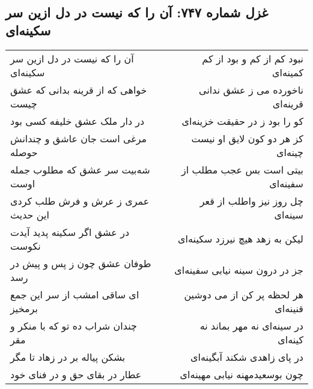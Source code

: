 \begin{center}
\section*{غزل شماره ۷۴۷: آن را که نیست در دل ازین سر سکینه‌ای}
\label{sec:747}
\begin{longtable}{l p{0.5cm} r}
آن را که نیست در دل ازین سر سکینه‌ای
&&
نبود کم از کم و بود از کم کمینه‌ای
\\
خواهی که از قرینه بدانی که عشق چیست
&&
ناخورده می ز عشق ندانی قرینه‌ای
\\
در دار ملک عشق خلیفه کسی بود
&&
کو را بود ز در حقیقت خزینه‌ای
\\
مرغی است جان عاشق و چندانش حوصله
&&
کز هر دو کون لایق او نیست چینه‌ای
\\
شه‌بیت سر عشق که مطلوب جمله اوست
&&
بیتی است بس عجب مطلب از سفینه‌ای
\\
عمری ز عرش و فرش طلب کردی این حدیث
&&
چل روز نیز واطلب از قعر سینه‌ای
\\
در عشق اگر سکینه پدید آیدت نکوست
&&
لیکن به زهد هیچ نیرزد سکینه‌ای
\\
طوفان عشق چون ز پس و پیش در رسد
&&
جز در درون سینه نیابی سفینه‌ای
\\
ای ساقی امشب از سر این جمع برمخیز
&&
هر لحظه پر کن از می دوشین قنینه‌ای
\\
چندان شراب ده تو که با منکر و مقر
&&
در سینه‌ای نه مهر بماند نه کینه‌ای
\\
بشکن پیاله بر در زهاد تا مگر
&&
در پای زاهدی شکند آبگینه‌ای
\\
عطار در بقای حق و در فنای خود
&&
چون بوسعیدمهنه نیابی مهینه‌ای
\\
\end{longtable}
\end{center}
